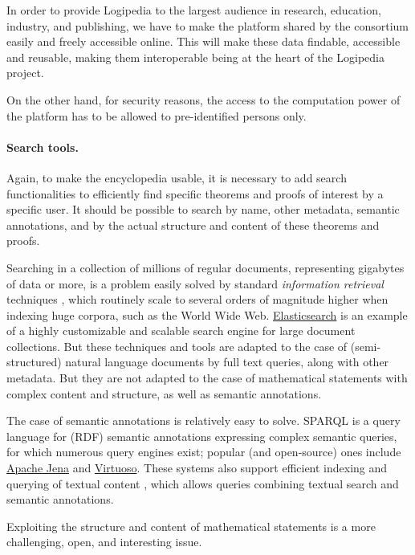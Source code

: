 In order to provide Logipedia to the largest audience in research,
education, industry, and publishing, we have to make the platform
shared by the consortium easily and freely accessible online. This
will make these data findable, accessible and reusable,
making them interoperable being at the heart of the Logipedia project.

On the other hand, for security reasons, the access to the computation
power of the platform has to be allowed to pre-identified persons only.

\paragraph*{Search tools.}

Again, to make the encyclopedia usable, it is necessary to add search
functionalities to efficiently find specific theorems and proofs of
interest by a specific user. It should be possible to search by name,
other metadata, semantic annotations, and by the actual structure and
content of these theorems and proofs.

Searching in a collection of millions of regular documents,
representing gigabytes of data or more, is a problem easily solved by
standard \emph{information retrieval} techniques
\cite{DBLP:books/daglib/0021593}, which routinely scale to several
orders of magnitude higher when indexing huge corpora, such as the
World Wide Web.
\href{https://www.elastic.co/fr/elasticsearch}{Elasticsearch}
is an example of a highly customizable and scalable search engine for
large document collections. But these techniques and tools are adapted
to the case of (semi-structured) natural language documents by full
text queries, along with other metadata. But they are not adapted to
the case of mathematical statements with complex content and
structure, as well as semantic annotations.

The case of semantic annotations is relatively easy to solve. SPARQL
\cite{sparql} is a
query language for (RDF) semantic annotations expressing complex semantic
queries, for which numerous
query engines exist; popular (and open-source) ones include
\href{https://jena.apache.org/}{Apache Jena} and
\href{http://vos.openlinksw.com/owiki/wiki/VOS}{Virtuoso}. These
systems also support efficient indexing and querying of textual content
\cite{DBLP:conf/esws/MinackSN09}, which allows queries combining textual
search and semantic annotations.

Exploiting the structure and content of mathematical statements is a more
challenging, open, and interesting issue.

